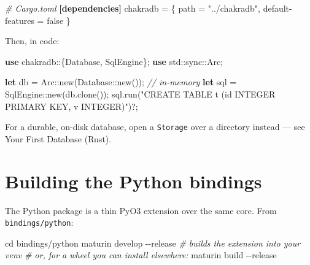 \documentclass[
  11pt,
  openany]{book}
\newenvironment{Shaded}{}{}
\newcommand{\AttributeTok}[1]{\textcolor[rgb]{0.49,0.56,0.16}{#1}}
\newcommand{\BuiltInTok}[1]{\textcolor[rgb]{0.00,0.50,0.00}{#1}}
\newcommand{\CommentTok}[1]{\textcolor[rgb]{0.38,0.63,0.69}{\textit{#1}}}
\newcommand{\ConstantTok}[1]{\textcolor[rgb]{0.53,0.00,0.00}{#1}}
\newcommand{\DataTypeTok}[1]{\textcolor[rgb]{0.56,0.13,0.00}{#1}}
\newcommand{\ExtensionTok}[1]{#1}
\newcommand{\KeywordTok}[1]{\textcolor[rgb]{0.00,0.44,0.13}{\textbf{#1}}}
\newcommand{\NormalTok}[1]{#1}
\newcommand{\OperatorTok}[1]{\textcolor[rgb]{0.40,0.40,0.40}{#1}}
\newcommand{\PreprocessorTok}[1]{\textcolor[rgb]{0.74,0.48,0.00}{#1}}
\newcommand{\StringTok}[1]{\textcolor[rgb]{0.25,0.44,0.63}{#1}}
\begin{document}
\begin{Shaded}
\begin{Highlighting}[]
\CommentTok{\# Cargo.toml}
\KeywordTok{[dependencies]}
\DataTypeTok{chakradb} \OperatorTok{=} \OperatorTok{\{ }\DataTypeTok{path}\OperatorTok{ =} \StringTok{"../chakradb"}\OperatorTok{, }\DataTypeTok{default{-}features}\OperatorTok{ =} \ConstantTok{false}\OperatorTok{ \}}
\end{Highlighting}
\end{Shaded}

Then, in code:

\begin{Shaded}
\begin{Highlighting}[]
\KeywordTok{use} \PreprocessorTok{chakradb::}\OperatorTok{\{}\NormalTok{Database}\OperatorTok{,}\NormalTok{ SqlEngine}\OperatorTok{\};}
\KeywordTok{use} \PreprocessorTok{std::sync::}\NormalTok{Arc}\OperatorTok{;}

\KeywordTok{let}\NormalTok{ db }\OperatorTok{=} \PreprocessorTok{Arc::}\NormalTok{new(}\PreprocessorTok{Database::}\NormalTok{new())}\OperatorTok{;}     \CommentTok{// in{-}memory}
\KeywordTok{let}\NormalTok{ sql }\OperatorTok{=} \PreprocessorTok{SqlEngine::}\NormalTok{new(db}\OperatorTok{.}\NormalTok{clone())}\OperatorTok{;}
\NormalTok{sql}\OperatorTok{.}\NormalTok{run(}\StringTok{"CREATE TABLE t (id INTEGER PRIMARY KEY, v INTEGER)"}\NormalTok{)}\OperatorTok{?;}
\end{Highlighting}
\end{Shaded}

For a durable, on-disk database, open a \texttt{Storage} over a
directory instead --- see Your First Database (Rust).

\section{Building the Python
bindings}\label{building-the-python-bindings}

The Python package is a thin PyO3 extension over the same core. From
\texttt{bindings/python}:

\begin{Shaded}
\begin{Highlighting}[]
\BuiltInTok{cd}\NormalTok{ bindings/python}
\ExtensionTok{maturin}\NormalTok{ develop }\AttributeTok{{-}{-}release}        \CommentTok{\# builds the extension into your venv}
\CommentTok{\# or, for a wheel you can install elsewhere:}
\ExtensionTok{maturin}\NormalTok{ build }\AttributeTok{{-}{-}release}
\end{Highlighting}
\end{Shaded}
\end{document}
